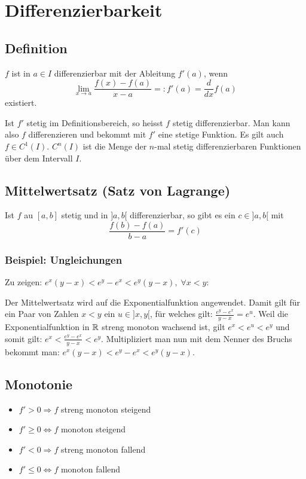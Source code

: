 \section{Differenzierbarkeit}
\subsection{Definition}
$f$ ist in $a \in I$ differenzierbar mit der Ableitung $f'(a)$, wenn
\[
\lim_{x \to a} \frac{f(x) - f(a)}{x - a} =: f'(a) = \frac{d}{dx}f(a)
\]
existiert.

Ist $f'$ stetig im Definitionsbereich, so heisst $f$ stetig differenzierbar. Man
kann also $f$ differenzieren und bekommt mit $f'$ eine stetige Funktion. Es gilt
auch $f \in C^1(I)$. $C^n(I)$ ist die Menge der $n$-mal stetig differenzierbaren
Funktionen über dem Intervall $I$.

\subsection{Mittelwertsatz (Satz von Lagrange)}
Ist $f$ au $[a,b]$ stetig und in $]a, b[$ differenzierbar, so gibt es ein $c
\in ]a,b[$ mit
\[
\frac{f(b) - f(a)}{b-a} = f'(c)
\]

\subsubsection{Beispiel: Ungleichungen}
Zu zeigen: $e^x(y-x) < e^y - e^x < e^y(y-x), \; \forall x < y$:


Der Mittelwertsatz wird auf die Exponentialfunktion angewendet. Damit gilt für
ein Paar von Zahlen $x < y$ ein $u \in ]x,y[$, für welches gilt: $\frac{e^y
- e^x}{y-x} = e^u$. Weil die Exponentialfunktion in $\mathbb{R}$ streng monoton wachsend
ist, gilt $e^x < e^u < e^y$ und somit gilt: $e^x < \frac{e^y-e^x}{y-x} < e^y$.
Multipliziert man nun mit dem Nenner des Bruchs bekommt man: $e^x (y-x) < e^y -
e^x < e^y(y-x)$.

\subsection{Monotonie}
\begin{itemize}
	\item $f' > 0 \Rightarrow f$ streng monoton steigend
	\item $f' \geq 0 \Leftrightarrow f$ monoton steigend
	\item $f' < 0 \Rightarrow f$ streng monoton fallend
	\item $f' \leq 0 \Leftrightarrow f$ monoton fallend
\end{itemize}


